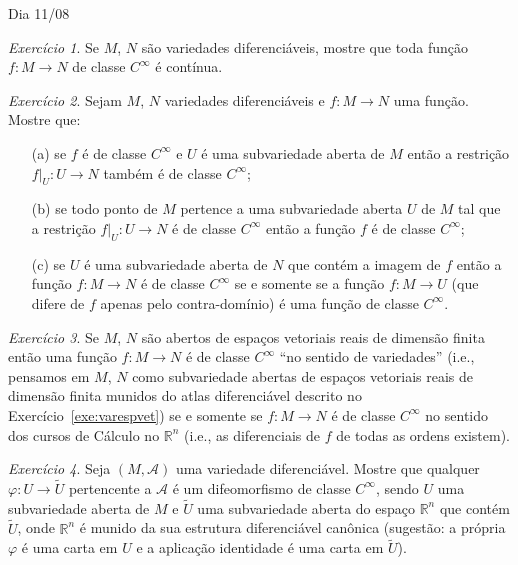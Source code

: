 \documentclass[oneside,11pt]{amsart}
\newcommand{\R}{\mathds R}
\theoremstyle{remark}\newtheorem{exercise}{Exercício}[section]
\theoremstyle{plain}\newtheorem{teo}{Teorema}[section]
\theoremstyle{plain}\newtheorem{lem}[teo]{Lema}
\theoremstyle{plain}\newtheorem{prop}[teo]{Proposição}
\theoremstyle{definition}\newtheorem{defin}[teo]{Definição}
\theoremstyle{remark}\newtheorem{rem}[teo]{Observação}
\theoremstyle{definition}\newtheorem{example}[teo]{Exemplo}
\numberwithin{equation}{section}
\begin{document}
\begin{section}{Dia 11/08}
\begin{exercise}\label{exe:smoothcontinuous}
Se $M$, $N$ são variedades diferenciáveis, mostre que toda função $f:M\to N$ de classe $C^\infty$ é contínua.
\end{exercise}

\begin{exercise}
Sejam $M$, $N$ variedades diferenciáveis e $f:M\to N$ uma função. Mostre que:
\begin{itemize}
\item[(a)] se $f$ é de classe $C^\infty$ e $U$ é uma subvariedade aberta de $M$ então a restrição $f\vert_U:U\to N$
também é de classe $C^\infty$;
\item[(b)] se todo ponto de $M$ pertence a uma subvariedade aberta $U$ de $M$ tal que a restrição $f\vert_U:U\to N$
é de classe $C^\infty$ então a função $f$ é de classe $C^\infty$;
\item[(c)] se $U$ é uma subvariedade aberta de $N$ que contém a imagem de $f$ então a função $f:M\to N$ é de classe $C^\infty$
se e somente se a função $f:M\to U$ (que difere de $f$ apenas pelo contra-domínio) é uma função de classe $C^\infty$.
\end{itemize}
\end{exercise}

\begin{exercise}\label{exe:smoothambiguous}
Se $M$, $N$ são abertos de espaços vetoriais reais de dimensão finita então uma função $f:M\to N$ é de classe
$C^\infty$ ``no sentido de variedades'' (i.e., pensamos em $M$, $N$ como subvariedade abertas de espaços vetoriais
reais de dimensão finita munidos do atlas diferenciável descrito no Exercício~\ref{exe:varespvet}) se e somente
se $f:M\to N$ é de classe $C^\infty$ no sentido dos cursos de Cálculo no $\R^n$ (i.e., as diferenciais de $f$ de todas as ordens existem).
\end{exercise}

\begin{exercise}\label{exe:cartadiff}
Seja $(M,\mathcal A)$ uma variedade diferenciável. Mostre que qualquer $\varphi:U\to\widetilde U$ pertencente a $\mathcal A$ é um difeomorfismo
de classe $C^\infty$, sendo $U$ uma subvariedade aberta de $M$ e $\widetilde U$ uma subvariedade aberta do espaço $\R^n$ que contém $\widetilde U$,
onde $\R^n$ é munido da sua estrutura diferenciável canônica (sugestão: a própria $\varphi$ é uma carta em $U$ e a aplicação identidade
é uma carta em $\widetilde U$).
\end{exercise}


\end{section}
\end{document}
